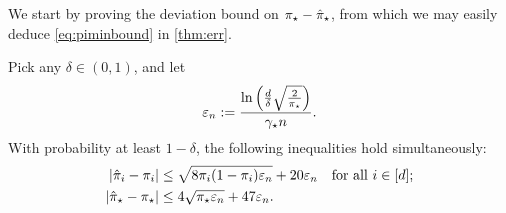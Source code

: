 We start by proving the deviation bound on $\pi_{\star}-\hat\pi_{\star}$, from
which we may easily deduce \cref{eq:piminbound} in \cref{thm:err}.
\begin{lemma}
  \label{lem:hatpimin}
  Pick any $\delta \in (0,1)$, and let
  \begin{equation}
    \varepsilon_n :=
    \frac{ \ln\left(\frac{d}\delta\sqrt{\frac{2}{\pi_{\star}}}\right) }{\gamma_{\star} n}
    .
    \label{eq:singleton-veps}
  \end{equation}
  With probability at least $1-\delta$, the following inequalities
  hold simultaneously:
  \begin{align}
    \left|\hat{\pi}_i-\pi_i\right|
    & \le
    \sqrt{8\pi_i(1-\pi_i) \varepsilon_n}
    + 20 \varepsilon_n
    \quad \text{for all $i \in [d]$}
    ;
    \label{eq:singletonboundsimple}
    \\
    \left|\hat\pi_{\star} - \pi_{\star}\right|
    & \leq
    4\sqrt{\pi_{\star}\varepsilon_n}
    + 47\varepsilon_n
    .
    \label{eq:hatpimin}
  \end{align}
\end{lemma}
